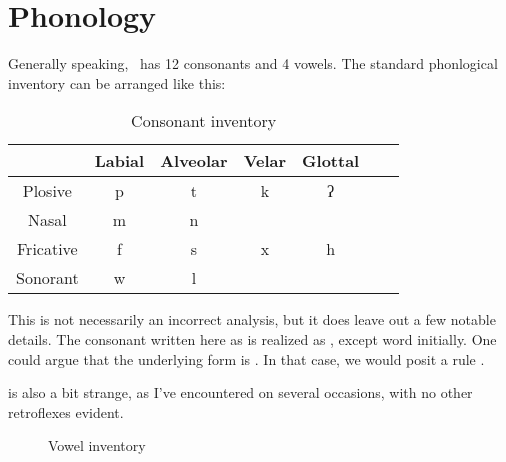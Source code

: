 \chapter{Phonology}

Generally speaking, \langname\ has 12 consonants and 4 vowels. The standard phonlogical inventory can be arranged like this:

\begin{table}[ht]


  \centering
  \begin{tabular}{*{7}{c}}
    \toprule
              & Labial & Alveolar & Velar & Glottal \\\midrule
    Plosive   & p      & t        & k     & ʔ       \\
    Nasal     & m      & n        &       &         \\
    Fricative & f      & s        & x     & h       \\
    Sonorant  & w      & l        &       &         \\
    \bottomrule
  \end{tabular}
  \caption{Consonant inventory}
\end{table}

This is not necessarily an incorrect analysis, but it does leave out a few notable details. The consonant written here as  is realized as , except word initially. One could argue that the underlying form is . In that case, we would posit a rule .


 is also a bit strange, as I've encountered  on several occasions, with no other retroflexes evident.

\begin{figure}[htbp]
  \centering
  \begin{vowel}
  \end{vowel}
  \caption{Vowel inventory}
\end{figure}
